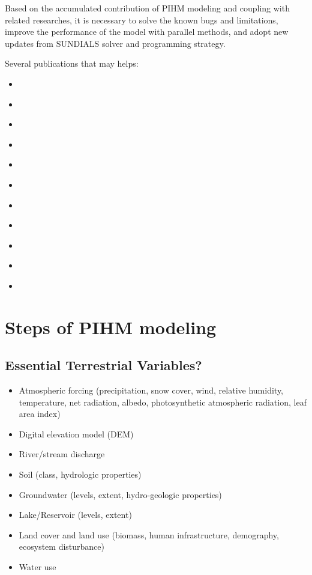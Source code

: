 \documentclass[]{scrbook}
\providecommand{\tightlist}{%
  \setlength{\itemsep}{0pt}\setlength{\parskip}{0pt}}
\begin{document}
Based on the accumulated contribution of PIHM modeling and coupling with
related researches, it is necessary to solve the known bugs and
limitations, improve the performance of the model with parallel methods,
and adopt new updates from SUNDIALS solver and programming strategy.

Several publications that may helps:

\begin{itemize}
\tightlist
\item
  \citep{Qu2004}
\item
  \citep{Qu2007}
\item
  \citep{Li2008}
\item
  \citep{Kumar2004a}
\item
  \citep{Kumar2009d}
\item
  \citep{Yu2015}
\item
  \citep{Yu2014}
\item
  \citep{Li2011}
\item
  \citep{Shi2015}
\item
  \citep{Shi2015a}
\item
  \citep{Bhatt2014}
\end{itemize}

\section{Steps of PIHM modeling}\label{steps-of-pihm-modeling}

\subsection{Essential Terrestrial
Variables?}\label{essential-terrestrial-variables}

\begin{itemize}
\tightlist
\item
  Atmospheric forcing (precipitation, snow cover, wind, relative
  humidity, temperature, net radiation, albedo, photosynthetic
  atmospheric radiation, leaf area index)
\item
  Digital elevation model (DEM)
\item
  River/stream discharge
\item
  Soil (class, hydrologic properties)
\item
  Groundwater (levels, extent, hydro-geologic properties)
\item
  Lake/Reservoir (levels, extent)
\item
  Land cover and land use (biomass, human infrastructure, demography,
  ecosystem disturbance)
\item
  Water use
\end{itemize}
\end{document}

